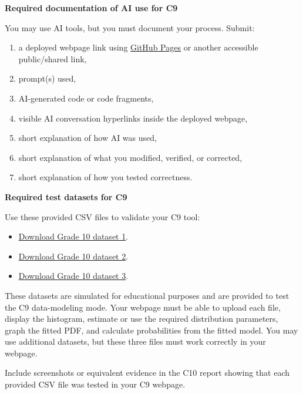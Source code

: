 \documentclass[12pt]{article}
\newcommand{\SubsectionBox}[1]{%
	\noindent\colorbox{gray!30}{%
		\parbox{\linewidth}{\textbf{#1}}%
	}\par\vspace{0.35cm}%
}
\begin{document}
	\SubsectionBox{Required documentation of AI use for C9}
	You may use AI tools, but you must document your process. Submit:
	\begin{enumerate}
		\item a deployed webpage link using \href{https://pages.github.com/}{GitHub Pages} or another accessible public/shared link,
		\item prompt(s) used,
		\item AI-generated code or code fragments,
		\item visible AI conversation hyperlinks inside the deployed webpage,
		\item short explanation of how AI was used,
		\item short explanation of what you modified, verified, or corrected,
		\item short explanation of how you tested correctness.
	\end{enumerate}
	
	\SubsectionBox{Required test datasets for C9}
	Use these provided CSV files to validate your C9 tool:
	\begin{itemize}
		\item \href{G10_T3_L4_C8C9C10_dataset_1.csv}{Download Grade 10 dataset 1}.
		\item \href{G10_T3_L4_C8C9C10_dataset_2.csv}{Download Grade 10 dataset 2}.
		\item \href{G10_T3_L4_C8C9C10_dataset_3.csv}{Download Grade 10 dataset 3}.
	\end{itemize}
	
	These datasets are simulated for educational purposes and are provided to test the C9 data-modeling mode. Your webpage must be able to upload each file, display the histogram, estimate or use the required distribution parameters, graph the fitted PDF, and calculate probabilities from the fitted model. You may use additional datasets, but these three files must work correctly in your webpage.
	
	Include screenshots or equivalent evidence in the C10 report showing that each provided CSV file was tested in your C9 webpage.
	
\end{document}
